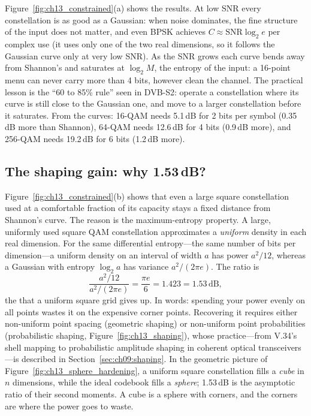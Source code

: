 Figure~\ref{fig:ch13_constrained}(a) shows the results. At low SNR every constellation is as good as
a Gaussian: when noise dominates, the fine structure of the input does not matter, and even BPSK
achieves $C\approx\mathrm{SNR}\log_2e$ per complex use (it uses only one of the two real
dimensions, so it follows the Gaussian curve only at very low SNR). As the SNR grows each curve
bends away from Shannon's and saturates at $\log_2M$, the entropy of the input: a 16-point menu can
never carry more than 4 bits, however clean the channel. The practical lesson is the ``60 to 85\%
rule'' seen in DVB-S2: operate a constellation where its curve is still close to the Gaussian one,
and move to a larger constellation before it saturates. From the curves: 16-QAM needs 5.1\,dB for
2 bits per symbol (0.35\,dB more than Shannon), 64-QAM needs 12.6\,dB for 4 bits (0.9\,dB more),
and 256-QAM needs 19.2\,dB for 6 bits (1.2\,dB more).

\subsection{The shaping gain: why 1.53\,dB?}


Figure~\ref{fig:ch13_constrained}(b) shows that even a large square constellation used at a
comfortable fraction of its capacity stays a fixed distance from Shannon's curve. The reason is the
maximum-entropy property. A large, uniformly used square QAM constellation approximates a
\emph{uniform} density in each real dimension. For the same differential entropy---the same number
of bits per dimension---a uniform density on an interval of width $a$ has power $a^2/12$, whereas a
Gaussian with entropy $\log_2a$ has variance $a^2/(2\pi e)$. The ratio is
\begin{equation}
\frac{a^2/12}{a^2/(2\pi e)}=\frac{\pi e}6=1.423=1.53\,\text{dB},
\label{eq:ch13:shaping}
\end{equation}
the  that a uniform square grid gives up. In words: spending your power evenly
on all points wastes it on the expensive corner points. Recovering it requires either non-uniform
point spacing (geometric shaping) or non-uniform point probabilities (probabilistic shaping,
Figure~\ref{fig:ch13_shaping}), whose practice---from V.34's shell mapping to probabilistic
amplitude shaping in coherent optical transceivers---is described in
Section~\ref{sec:ch09:shaping}. In the geometric picture of Figure~\ref{fig:ch13_sphere_hardening},
a uniform square constellation fills a \emph{cube} in $n$ dimensions, while the ideal codebook
fills a \emph{sphere}; 1.53\,dB is the asymptotic ratio of their second moments. A cube is a
sphere with corners, and the corners are where the power goes to waste.


